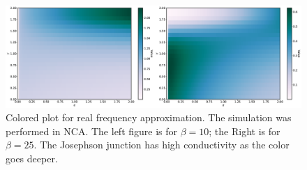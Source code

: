 \documentclass{article}[12pt]
\begin{document}
\begin{spacing}{1.5}
\begin{figure}[H]
  \centerline{\includegraphics[width=16cm]{TexFigure/4/4_4_03_chi_color.png}}
  \caption{Colored plot for real frequency approximation. The simulation was performed in NCA. The left figure is for $\beta=10$; the Right is for $\beta=25$.
  The Josephson junction has high conductivity as the color goes deeper.}
 \end{figure}
\pagebreak

\end{spacing}
\end{document}
